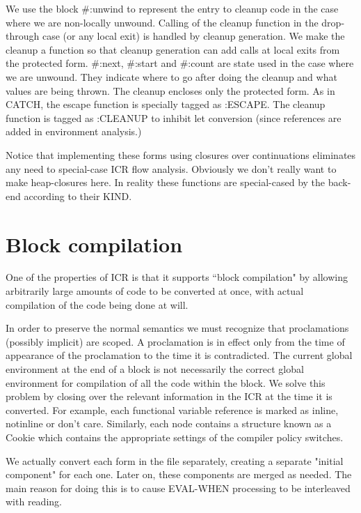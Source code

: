 We use the block \#:unwind to represent the entry to cleanup code in the case
where we are non-locally unwound.  Calling of the cleanup function in the
drop-through case (or any local exit) is handled by cleanup generation.  We
make the cleanup a function so that cleanup generation can add calls at local
exits from the protected form.  \#:next, \#:start and \#:count are state used in
the case where we are unwound.  They indicate where to go after doing the
cleanup and what values are being thrown.  The cleanup encloses only the
protected form.  As in CATCH, the escape function is specially tagged as
:ESCAPE.  The cleanup function is tagged as :CLEANUP to inhibit let conversion
(since references are added in environment analysis.)

Notice that implementing these forms using closures over continuations
eliminates any need to special-case ICR flow analysis.  Obviously we don't
really want to make heap-closures here.  In reality these functions are
special-cased by the back-end according to their KIND.


\section{Block compilation}

One of the properties of ICR is that it supports ``block compilation" by allowing
arbitrarily large amounts of code to be converted at once, with actual
compilation of the code being done at will.


In order to preserve the normal semantics we must recognize that proclamations
(possibly implicit) are scoped.  A proclamation is in effect only from the time
of appearance of the proclamation to the time it is contradicted.  The current
global environment at the end of a block is not necessarily the correct global
environment for compilation of all the code within the block.  We solve this
problem by closing over the relevant information in the ICR at the time it is
converted.  For example, each functional variable reference is marked as
inline, notinline or don't care.  Similarly, each node contains a structure
known as a Cookie which contains the appropriate settings of the compiler
policy switches.

We actually convert each form in the file separately, creating a separate
"initial component" for each one.  Later on, these components are merged as
needed.  The main reason for doing this is to cause EVAL-WHEN processing to be
interleaved with reading. 


